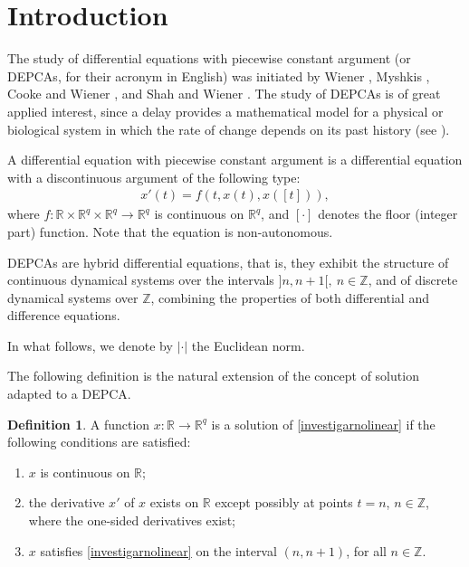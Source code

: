 \documentclass[english,,reqno]{amsart}
\numberwithin{equation}{section}
\theoremstyle{plain}
\theoremstyle{definition}
\newtheorem{defn}{Definition}[section]
\theoremstyle{remark}
\begin{document}
\section{Introduction}

The study of differential equations with piecewise constant argument (or DEPCAs, for their acronym in English) was initiated by Wiener \cite{288,289,wiener_book}, Myshkis \cite{203}, Cooke and Wiener \cite{51}, and Shah and Wiener \cite{244}.  
The study of DEPCAs is of great applied interest, since a delay provides a mathematical model for a physical or biological system in which the rate of change depends on its past history (see \cite{liming_dai,asymtotyc,cauchy,kuo,robledo}).  


A differential equation with piecewise constant argument is a differential equation with a discontinuous argument of the following type:  
\begin{eqnarray}
x'(t) = f(t, x(t), x([t])), \label{investigarnolinear}
\end{eqnarray}  
where $f: \mathbb{R} \times \mathbb{R}^q \times \mathbb{R}^q \rightarrow \mathbb{R}^q$ is continuous on $\mathbb{R}^q$, and $[\cdot]$ denotes the floor (integer part) function. Note that the equation is non-autonomous.  

DEPCAs are hybrid differential equations, that is, they exhibit the structure of continuous dynamical systems over the intervals $]n, n+1[,\ n \in \mathbb{Z}$, and of discrete dynamical systems over $\mathbb{Z}$, combining the properties of both differential and difference equations.

In what follows, we denote by $|\cdot|$ the Euclidean norm.

The following definition is the natural extension of the concept of solution adapted to a DEPCA.

\begin{defn}\label{def_sol_DEPCA}
A function $x:\mathbb{R}\rightarrow\mathbb{R}^{q}$ is a solution of \eqref{investigarnolinear} if the following conditions are satisfied:  
\begin{enumerate}
\item[$(i)$] $x$ is continuous on $\mathbb{R}$;
\item[$(ii)$] the derivative $x'$ of $x$ exists on $\mathbb{R}$  
except possibly at points $t=n$, $n\in\mathbb{Z}$, where the one-sided derivatives exist;
\item[$(iii)$] $x$ satisfies \eqref{investigarnolinear}  
on the interval $(n, n+1)$, for all $n\in\mathbb{Z}$.
\end{enumerate}
\end{defn}
\end{document}
